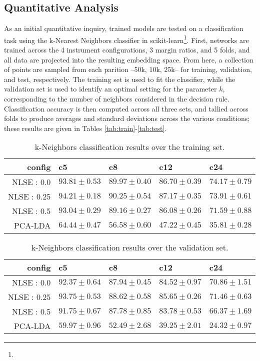 \subsection{Quantitative Analysis}

As an initial quantitative inquiry, trained models are tested on a classification task using the k-Nearest Neighbors classifier in scikit-learn\footnote{}.
First, networks are trained across the 4 instrument configurations, 3 margin ratios, and 5 folds, and all data are projected into the resulting embedding space.
From here, a collection of points are sampled from each parition --50k, 10k, 25k-- for training, validation, and test, respectively.
The training set is used to fit the classifier, while the validation set is used to identify an optimal setting for the parameter $k$, corresponding to the number of neighbors considered in the decision rule.
Classification accuracy is then computed across all three sets, and tallied across folds to produce averages and standard deviations across the various conditions; these results are given in Tables \ref{tab:train}-\ref{tab:test}.


\begin{table*}[h]
\begin{center}
\caption{k-Neighbors classification results over the training set.}
\small
\begin{tabular}{rllll}
 config  & c5    & c8   & c12  & c24  \\
\hline
 NLSE : 0.0  & $93.81\pm0.53$ & $89.97\pm0.40$ & $86.70\pm0.39$ & $74.17\pm0.79$ \\
 NLSE : 0.25 & $94.21\pm0.18$ & $90.25\pm0.54$ & $87.17\pm0.35$ & $73.91\pm0.61$ \\
 NLSE : 0.5  & $93.04\pm0.29$ & $89.16\pm0.27$ & $86.08\pm0.26$ & $71.59\pm0.88$ \\
 \hline
 PCA-LDA & $64.44\pm0.47$ & $56.58\pm0.60$ & $47.22\pm0.45$ & $35.81\pm0.28$ \\

\hline
\end{tabular}
\label{tab:things}
\end{center}
\end{table*}

\begin{table*}[h]
\begin{center}
\caption{k-Neighbors classification results over the validation set.}
\small
\begin{tabular}{rllll}
\hline
config & c5  & c8 & c12   & c24     \\
\hline
 NLSE : 0.0  & $92.37\pm0.64$ & $87.94\pm0.45$ & $84.52\pm0.97$ & $70.86\pm1.51$ \\
 NLSE : 0.25 & $93.75\pm0.53$ & $88.62\pm0.58$ & $85.65\pm0.26$ & $71.46\pm0.63$ \\
 NLSE : 0.5  & $91.75\pm0.67$ & $87.78\pm0.85$ & $83.78\pm0.53$ & $66.37\pm1.69$ \\
 \hline
 PCA-LDA & $59.97\pm0.96$ & $52.49\pm2.68$ & $39.25\pm2.01$ & $24.32\pm0.97$ \\
\hline
\end{tabular}
\label{tab:things}
\end{center}
\end{table*}

